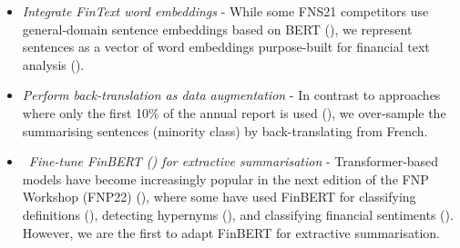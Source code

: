 \begin{itemize}
    \item \emph{Integrate FinText word embeddings} - While some FNS21 competitors use general-domain sentence embeddings
    based on BERT (\cite{litvak-vanetik-2021-summarization, gokhan-etal-2021-extractive}), we represent sentences as
    a vector of word embeddings purpose-built for financial text analysis (\cite{rahimikia2021realised}).
    \item \emph{Perform back-translation as data augmentation} - In contrast to approaches where only the first 10\% of
    the annual report is used (\cite{orzhenovskii-2021-t5}), we over-sample the summarising sentences (minority class)
    by back-translating from French.
    \item~\emph{Fine-tune FinBERT (\cite{yang2020finbert}) for extractive summarisation} - Transformer-based models have become increasingly
    popular in the next edition of the FNP Workshop (FNP22) (\cite{khanna-etal-2022-transformer, pant-chopra-2022-multilingual}),
    where some have used FinBERT for classifying definitions (\cite{ghosh-etal-2022-finrad}),
    detecting hypernyms (\cite{peng-etal-2022-discovering}), and classifying financial sentiments (\cite{stepisnik-perdih-etal-2022-sentiment}).
    However, we are the first to adapt FinBERT for extractive summarisation.
\end{itemize}

